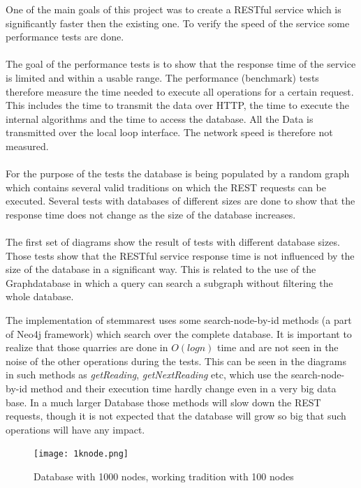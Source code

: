\documentclass[11pt,fleqn,openany]{book} %
\begin{document}
One of the main goals of this project was to create a RESTful service which is significantly faster then the existing one. To verify the speed of the service some performance tests are done. 
\\ \quad \\
The goal of the performance tests is to show that the response time of the service is limited and within a usable range. The performance (benchmark) tests therefore measure the time needed to execute all operations for a certain request. This includes the time to transmit the data over HTTP, the time to execute the internal algorithms and the time to access the database. All the Data is transmitted over the local loop interface. The network speed is therefore not measured. 
\\ \quad \\
For the purpose of the tests the database is being populated by a random graph which contains several valid traditions on which the REST requests can be executed. Several tests with databases of different sizes are done to show that the response time does not change as the size of the database increases.
\\ \quad \\
The first set of diagrams show the result of tests with different database sizes. Those tests show that the RESTful service response time is not influenced by the size of the database in a significant way. This is related to the use of the Graphdatabase in which a query can search a subgraph without filtering the whole database. 
\begin{remark}
The implementation of stemmarest uses some search-node-by-id methods (a part of Neo4j framework) which search over the complete database. It is important to realize that those quarries are done in $O(log n)$ time and are not seen in the noise of the other operations during the tests. This can be seen in the diagrams in such methods as \textit{getReading}, \textit{getNextReading} etc, which use the search-node-by-id method and their execution time hardly change even in a very big data base. In a much larger Database those methods will slow down the REST requests, though it is not expected that the database will grow so big that such operations will have any impact.
\end{remark} 

\begin{figure}[h!]
  \caption{Database with 1000 nodes,  working tradition with 100 nodes }
  \centering
    \texttt{[image: 1knode.png]}
\end{figure}
\end{document}
